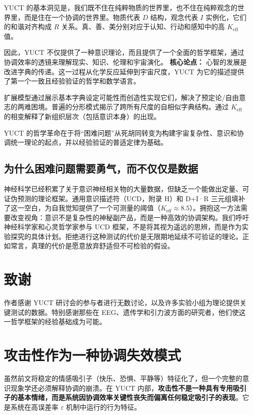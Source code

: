 \documentclass[12pt,a4paper]{article}
\newcommand{\eff}{\mathrm{eff}}
\newcommand{\Ke}{K_{\eff}}
\begin{document}
		YUCT 的基本洞见是，我们既不住在纯粹物质的世界里，也不住在纯粹观念的世界里，而是住在一个协调的世界里。物质代表 $D$ 结构，观念代表 $I$ 实例化，它们的和谐对齐构成 $R$ 关系。真、善、美分别对应于认知、行动和感知中的高 $\Ke$ 值。
		
		因此，YUCT 不仅提供了一种意识理论，而且提供了一个全面的哲学框架，通过协调效率的透镜来理解现实、知识、伦理和宇宙演化。
		\textbf{核心论点：} 心智的发展是改进字典的传递。这一过程从化学反应延伸到宇宙尺度，YUCT 为它的描述提供了第一个一致且经验验证的哲学和数学语言。
		
		扩展模型通过展示基本字典设定可能性而创造性实现它们，解决了预定论/自由意志的两难困境。普遍的分形模式揭示了跨所有尺度的自相似字典结构。通过 $\Ke$ 的相变解释了新组织层次（包括意识本身）的出现。
		
		YUCT 的哲学革命在于将“困难问题”从死胡同转变为构建宇宙复杂性、意识和协调统一理论的起点，并以经验验证的普适定律为基础。
		
		\subsection{为什么困难问题需要勇气，而不仅仅是数据}
		\label{subsec:courage-consciousness}
		
		神经科学已经积累了关于意识神经相关物的大量数据，但缺乏一个能做出定量、可证伪预测的理论框架。通用意识描述符（UCD，附录 H）和 D+I·R 三元组填补了这一空白，为自我觉知提供了一个可测量的阈值（$K_{\mathrm{eff}} \approx 8.5$）。拥抱这一方法需要改变视角：意识不是复杂性的神秘副产品，而是一种高效的协调架构。我们呼吁神经科学家和心灵哲学家参与 UCD 框架，不是将其视为遥远的思辨，而是作为实验探究的具体计划。拒绝进行这种测试的代价是无限期地延续不可验证的理论。正如常言，真理的代价是愿意放弃舒适但不可检验的假设。
		
		\section*{致谢}
		
		作者感谢 YUCT 研讨会的参与者进行无数讨论，以及许多实验小组为理论提供关键测试的数据。特别感谢那些在 EEG、遗传学和引力波方面的研究者，他们使这一哲学框架的经验基础成为可能。
		
		\section{攻击性作为一种协调失效模式}
		
		虽然前文将稳定的情感吸引子（快乐、恐惧、平静等）特征化了，但一个完整的意识现象学还必须解释协调的崩溃。在 YUCT 内部，\textbf{攻击性不是一种具有专用吸引子的基本情绪，而是系统因协调效率关键性丧失而偏离任何稳定吸引子的表现}。它是系统在高误差率 $\varepsilon$ 机制中运行的行为特征。
		
\end{document}
